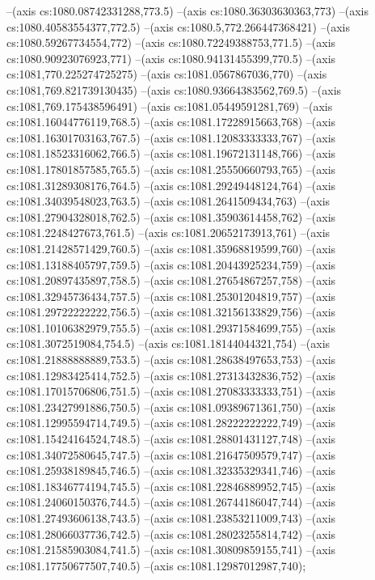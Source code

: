 --(axis cs:1080.08742331288,773.5)
--(axis cs:1080.36303630363,773)
--(axis cs:1080.40583554377,772.5)
--(axis cs:1080.5,772.266447368421)
--(axis cs:1080.59267734554,772)
--(axis cs:1080.72249388753,771.5)
--(axis cs:1080.90923076923,771)
--(axis cs:1080.94131455399,770.5)
--(axis cs:1081,770.225274725275)
--(axis cs:1081.0567867036,770)
--(axis cs:1081,769.821739130435)
--(axis cs:1080.93664383562,769.5)
--(axis cs:1081,769.175438596491)
--(axis cs:1081.05449591281,769)
--(axis cs:1081.16044776119,768.5)
--(axis cs:1081.17228915663,768)
--(axis cs:1081.16301703163,767.5)
--(axis cs:1081.12083333333,767)
--(axis cs:1081.18523316062,766.5)
--(axis cs:1081.19672131148,766)
--(axis cs:1081.17801857585,765.5)
--(axis cs:1081.25550660793,765)
--(axis cs:1081.31289308176,764.5)
--(axis cs:1081.29249448124,764)
--(axis cs:1081.34039548023,763.5)
--(axis cs:1081.2641509434,763)
--(axis cs:1081.27904328018,762.5)
--(axis cs:1081.35903614458,762)
--(axis cs:1081.2248427673,761.5)
--(axis cs:1081.20652173913,761)
--(axis cs:1081.21428571429,760.5)
--(axis cs:1081.35968819599,760)
--(axis cs:1081.13188405797,759.5)
--(axis cs:1081.20443925234,759)
--(axis cs:1081.20897435897,758.5)
--(axis cs:1081.27654867257,758)
--(axis cs:1081.32945736434,757.5)
--(axis cs:1081.25301204819,757)
--(axis cs:1081.29722222222,756.5)
--(axis cs:1081.32156133829,756)
--(axis cs:1081.10106382979,755.5)
--(axis cs:1081.29371584699,755)
--(axis cs:1081.3072519084,754.5)
--(axis cs:1081.18144044321,754)
--(axis cs:1081.21888888889,753.5)
--(axis cs:1081.28638497653,753)
--(axis cs:1081.12983425414,752.5)
--(axis cs:1081.27313432836,752)
--(axis cs:1081.17015706806,751.5)
--(axis cs:1081.27083333333,751)
--(axis cs:1081.23427991886,750.5)
--(axis cs:1081.09389671361,750)
--(axis cs:1081.12995594714,749.5)
--(axis cs:1081.28222222222,749)
--(axis cs:1081.15424164524,748.5)
--(axis cs:1081.28801431127,748)
--(axis cs:1081.34072580645,747.5)
--(axis cs:1081.21647509579,747)
--(axis cs:1081.25938189845,746.5)
--(axis cs:1081.32335329341,746)
--(axis cs:1081.18346774194,745.5)
--(axis cs:1081.22846889952,745)
--(axis cs:1081.24060150376,744.5)
--(axis cs:1081.26744186047,744)
--(axis cs:1081.27493606138,743.5)
--(axis cs:1081.23853211009,743)
--(axis cs:1081.28066037736,742.5)
--(axis cs:1081.28023255814,742)
--(axis cs:1081.21585903084,741.5)
--(axis cs:1081.30809859155,741)
--(axis cs:1081.17750677507,740.5)
--(axis cs:1081.12987012987,740);
